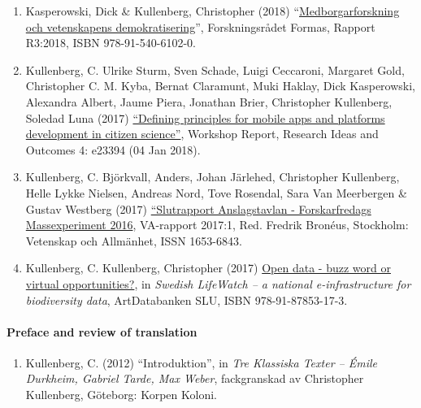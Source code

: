 \documentclass[
]{article}
\providecommand{\tightlist}{%
  \setlength{\itemsep}{0pt}\setlength{\parskip}{0pt}}
\begin{document}
\begin{enumerate}
\def\labelenumi{\arabic{enumi}.}
\tightlist
\item
  Kasperowski, Dick \& Kullenberg, Christopher (2018)
  ``\href{http://www.formas.se/sv/Om-Formas/Formas-Publikationer/Rapporter/Medborgarforskning-och-vetenskapens-demokratisering/}{Medborgarforskning
  och vetenskapens demokratisering}'', Forskningsrådet Formas, Rapport
  R3:2018, ISBN 978-91-540-6102-0.
\item
  Kullenberg, C. Ulrike Sturm, Sven Schade, Luigi Ceccaroni, Margaret
  Gold, Christopher C. M. Kyba, Bernat Claramunt, Muki Haklay, Dick
  Kasperowski, Alexandra Albert, Jaume Piera, Jonathan Brier,
  Christopher Kullenberg, Soledad Luna (2017)
  \href{https://doi.org/10.3897/rio.4.e23394}{``Defining principles for
  mobile apps and platforms development in citizen science''}, Workshop
  Report, Research Ideas and Outcomes 4: e23394 (04 Jan 2018).
\item
  Kullenberg, C. Björkvall, Anders, Johan Järlehed, Christopher
  Kullenberg, Helle Lykke Nielsen, Andreas Nord, Tove Rosendal, Sara Van
  Meerbergen \& Gustav Westberg (2017)
  \href{https://www.forskarfredag.se/filer/ff2016-anslagstavlan-slutrapport.pdf}{``Slutrapport
  Anslagstavlan - Forskarfredags Massexperiment 2016}, VA-rapport
  2017:1, Red. Fredrik Bronéus, Stockholm: Vetenskap och Allmänhet, ISSN
  1653-6843.
\item
  Kullenberg, C. Kullenberg, Christopher (2017)
  \href{http://www.slu.se/globalassets/ew/subw/lifewatch/publikationer/slw-summary-report-web-170622.pdf}{Open
  data - buzz word or virtual opportunities?}, in \emph{Swedish
  LifeWatch -- a national e-infrastructure for biodiversity data},
  ArtDatabanken SLU, ISBN 978-91-87853-17-3.
\end{enumerate}

\hypertarget{preface-and-review-of-translation}{%
\paragraph{Preface and review of
translation}\label{preface-and-review-of-translation}}

\begin{enumerate}
\def\labelenumi{\arabic{enumi}.}
\tightlist
\item
  Kullenberg, C. (2012) ``Introduktion'', in \emph{Tre Klassiska Texter
  -- Émile Durkheim, Gabriel Tarde, Max Weber}, fackgranskad av
  Christopher Kullenberg, Göteborg: Korpen Koloni.
\end{enumerate}
\end{document}
